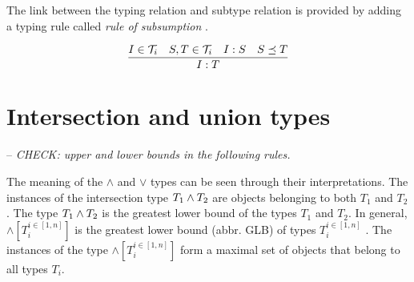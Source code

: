 \documentclass[runningheads]{llncs}
\newcommand{\T}{{\cal T}}
\newcommand{\memo}[1]{}
\newcommand{\notes}[1]{\noindent\begin{small}-- \emph{#1}\hfill\break\end{small}}
\begin{document}
The link between the typing relation and subtype relation is provided
by adding a typing rule called \emph{rule of subsumption}
\cite{Pierce2002}.

\begin{equation}
\label{rul:typing-subsumption}
\dfrac{I\in\T_i\quad\/S,T\in\T_i\quad\/I:S\quad\/S\preceq\/T}
      {I:T}    
\end{equation}


\memo{Properties have dual role: they are instances and types at the same time.}
\memo{Present the features of properties from this point of view.}






\section{Intersection and union types\label{sec:intsc-union}}

\memo{
The meaning of the $\land$ and $\lor$ types can be defined through
their interpretations. The following definition expresses the
denotation of a $\lor$ type with the interpretations of its component
types. Suppose we have a set of types
$\forall\/i\in\/[1..n],\ T_i\in\T$.

\begin{displaymath}
  \llbracket\lor[T_i^{i\in[1,n]}]\rrbracket_\D = \bigcup_{i\in[1..n]}\llbracket\/T_i\rrbracket_\D
\end{displaymath}

Similarly, the interpretation of a $\land$ type is the intersection of
the interpretations of its component types.

\begin{displaymath}
\llbracket\land[T_i^{i\in[1,n]}]\rrbracket_\D = \bigcap_{i\in[1..n]}\llbracket\/T_i\rrbracket_\D
\end{displaymath}}

\notes{CHECK: upper and lower bounds in the following rules.}

The meaning of the $\land$ and $\lor$ types can be seen through
their interpretations. The instances of the intersection type
$T_1\land\/T_2$ are objects belonging to both $T_1$ and $T_2$. The
type $T_1\land\/T_2$ is the greatest lower bound of the types $T_1$
and $T_2$. In general, $\land[T_i^{i\in[1,n]}]$ is the greatest lower
bound (abbr. GLB) of types $T_i^{i\in[1,n]}$
\cite{Pierce1991,Pierce1996}. The instances of the type
$\land[T_i^{i\in[1,n]}]$ form a maximal set of objects that belong to
all types $T_i$.
\end{document}
